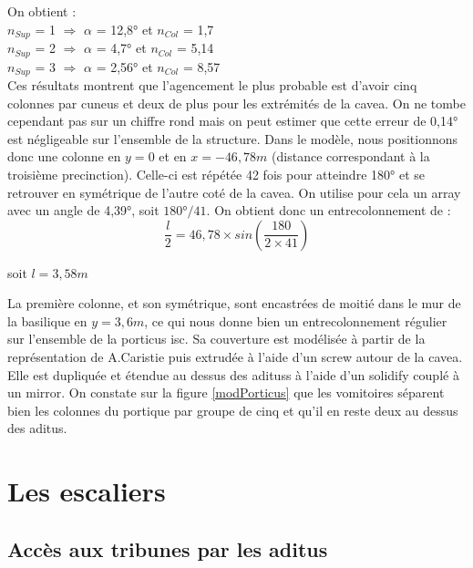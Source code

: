 On obtient : \\
$n_{Sup}$ = 1 $\Rightarrow$ $\alpha$ = 12,8° et $n_{Col}$ = 1,7 \\
$n_{Sup}$ = 2 $\Rightarrow$ $\alpha$ = 4,7° et $n_{Col}$ = 5,14 \\
$n_{Sup}$ = 3 $\Rightarrow$ $\alpha$ = 2,56° et $n_{Col}$ = 8,57 \\


Ces résultats montrent que l'agencement le plus probable est d'avoir cinq colonnes par \gls{cuneus} et deux de plus pour les extrémités de la \gls{cavea}. On ne tombe cependant pas sur un chiffre rond mais on peut estimer que cette erreur de 0,14° est négligeable sur l'ensemble de la structure. Dans le modèle, nous positionnons donc une colonne en $y=0$ et en $x=-46,78m$ (distance correspondant à la troisième \gls{precinction}). Celle-ci est répétée 42 fois pour atteindre 180° et se retrouver en symétrique de l'autre coté de la \gls{cavea}. On utilise pour cela un \gls{array} avec un angle de 4,39°, soit $180°/41$. On obtient donc un entrecolonnement de :
\begin{equation}
	\frac{l}{2} =  46,78 \times  sin(\frac{180}{2 \times 41}) 
\end{equation}
\begin{center}
	soit $l = 3,58m$
\end{center}	

La première colonne, et son symétrique, sont encastrées de moitié dans le mur de la basilique en $y=3,6m$, ce qui nous donne bien un entrecolonnement régulier sur l'ensemble de la \gls{porticus isc}. Sa couverture est modélisée à partir de la représentation de A.Caristie \cite[Pl. III et VI]{orangePl} puis extrudée à l'aide d'un \gls{screw} autour de la  \gls{cavea}. Elle est dupliquée et étendue au dessus des \glspl{aditus} à l'aide d'un \gls{solidify} couplé à un \gls{mirror}. On constate sur la figure \ref{modPorticus} que les vomitoires séparent bien les colonnes du portique par groupe de cinq et qu'il en reste deux au dessus des  \gls{aditus}.

\section{Les escaliers} \label{sect-escaliers}

\subsection{Accès aux tribunes par les  \gls{aditus}}

